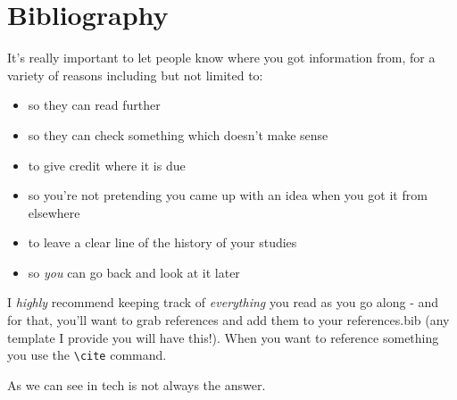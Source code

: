 \documentclass{article}
\begin{document}
\section{Bibliography}

It's really important to let people know where you got information from, for a variety of reasons including but not limited to:
\begin{itemize}
    \item so they can read further
    \item so they can check something which doesn't make sense
    \item to give credit where it is due
    \item so you're not pretending you came up with an idea when you got it from elsewhere
    \item to leave a clear line of the history of your studies
    \item so \textit{you} can go back and look at it later
\end{itemize}

I \textit{highly} recommend keeping track of \textit{everything} you read as you go along - and for that, you'll want to grab references and add them to your references.bib (any template I provide you will have this!). When you want to reference something you use the \texttt{\textbackslash cite} command.

As we can see in \cite{reich2020failure} tech is not always the answer.

 
\end{document}

